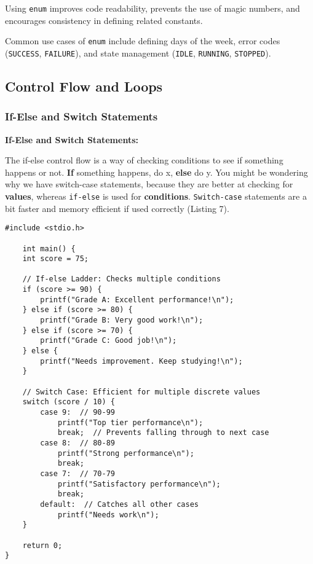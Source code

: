 \documentclass[a4paper,12pt]{article}
\begin{document}
Using \texttt{enum} improves code readability, prevents the use of magic numbers, and encourages consistency in defining related constants.

Common use cases of \texttt{enum} include defining days of the week, error codes (\texttt{SUCCESS}, \texttt{FAILURE}), and state management (\texttt{IDLE}, \texttt{RUNNING}, \texttt{STOPPED}).

\hrulefill

\newpage

\subsection{Control Flow and Loops}

\subsubsection{If-Else and Switch Statements}

\textbf{If-Else and Switch Statements:}

The if-else control flow is a way of checking conditions to see if something happens or not. \textbf{If} something happens, do x, \textbf{else} do y. You might be wondering why we have switch-case statements, because they are better at checking for \textbf{values}, whereas \verb|if-else| is used for \textbf{conditions}. \verb|Switch-case| statements are a bit faster and memory efficient if used correctly (Listing 7).

\lstset{language=C}
\begin{lstlisting}[caption=If-Else control flow example]
    #include <stdio.h>
    
    int main() {
    int score = 75;
    
    // If-else Ladder: Checks multiple conditions
    if (score >= 90) {
        printf("Grade A: Excellent performance!\n");
    } else if (score >= 80) {
        printf("Grade B: Very good work!\n");
    } else if (score >= 70) {
        printf("Grade C: Good job!\n");
    } else {
        printf("Needs improvement. Keep studying!\n");
    }
    
    // Switch Case: Efficient for multiple discrete values
    switch (score / 10) {
        case 9:  // 90-99
            printf("Top tier performance\n");
            break;  // Prevents falling through to next case
        case 8:  // 80-89
            printf("Strong performance\n");
            break;
        case 7:  // 70-79
            printf("Satisfactory performance\n");
            break;
        default:  // Catches all other cases
            printf("Needs work\n");
    }
    
    return 0;
}\end{lstlisting}
\end{document}
